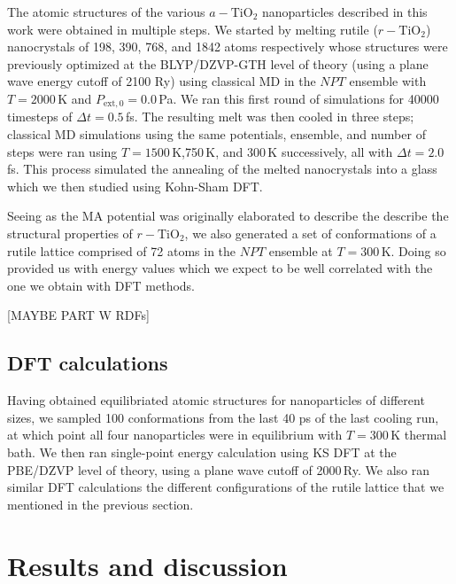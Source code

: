 \documentclass[preprint,aps,draft]{revtex4}
\newcommand\tab[1][1cm]{\hspace*{#1}} %
\begin{document}
\tab The atomic structures of the various $a-\text{TiO}_2$ nanoparticles described in this work were obtained in multiple steps.
We started by melting rutile ($r-\text{TiO}_2$) nanocrystals of 198, 390, 768, and 1842 atoms respectively whose structures were previously optimized at the BLYP/DZVP-GTH level of theory (using a plane wave energy cutoff of 2100 Ry) using classical MD in the $NPT$ ensemble with $T = 2000\,$K and $P_{\text{ext},0} = 0.0\,$Pa. 
We ran this first round of simulations for 40000 timesteps of $\Delta t = 0.5\,$fs.
The resulting melt was then cooled in three steps; classical MD simulations using the same potentials, ensemble, and number of steps were ran using $T = 1500\,$K,750$\,$K, and 300$\,$K successively, all with $\Delta t = 2.0\,$fs.
This process simulated the annealing of the melted nanocrystals into a glass which we then studied using Kohn-Sham DFT.

\tab Seeing as the MA potential was originally elaborated to describe the describe the structural properties of $r-\text{TiO}_2$, we also generated a set of conformations of a rutile lattice comprised of 72 atoms in the $NPT$ ensemble at $T = 300\,\text{K}$. 
Doing so provided us with energy values which we expect to be well correlated with the one we obtain with DFT methods. 

[MAYBE PART W RDFs]


\subsection{DFT calculations}

\tab Having obtained equilibriated atomic structures for nanoparticles of different sizes, we sampled 100 conformations from the last 40 ps of the last cooling run, at which point all four nanoparticles were in equilibrium with $T = 300\,\text{K}$ thermal bath.
We then ran single-point energy calculation using KS DFT at the PBE/DZVP level of theory, using a plane wave cutoff of 2000$\,$Ry.
We also ran similar DFT calculations the different configurations of the rutile lattice that we mentioned in the previous section.


\section*{Results and discussion}
    
\end{document}
